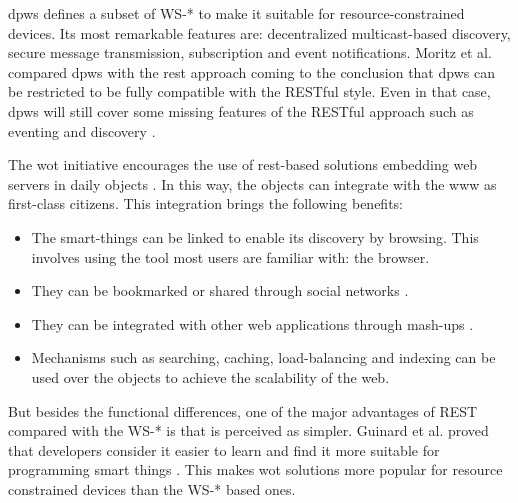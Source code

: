 

\ac{dpws} defines a subset of WS-* to make it suitable for resource-constrained devices.
Its most remarkable features are: decentralized multicast-based discovery, secure message transmission, subscription and event notifications.
Moritz et al. compared \ac{dpws} with the \ac{rest} approach coming to the conclusion that \ac{dpws} can be restricted to be fully compatible with the RESTful style.
Even in that case, \ac{dpws} will still cover some missing features of the RESTful approach such as eventing and discovery \cite{moritz_devices_2010}.


The \acl{wot} initiative encourages the use of \acs{rest}-based solutions embedding web servers in daily objects \cite{guinard_internet_2011}.
In this way, the objects can integrate with the \ac{www} as first-class citizens. %
This integration brings the following benefits:
\begin{itemize}
  \item The smart-things can be linked to enable its discovery by browsing. This involves using the tool most users are familiar with: the browser.
  \item They can be bookmarked or shared through social networks \cite{guinard_sharing_2010}.
  \item They can be integrated with other web applications through mash-ups \cite{guinard_towards_2009,ostermaier_webplug:_2010,pintus_anatomy_2011}.
  \item Mechanisms such as searching, caching, load-balancing and indexing can be used over the objects to achieve the scalability of the web. %
\end{itemize}


But besides the functional differences, one of the major advantages of REST compared with the WS-* is that is perceived as simpler.
Guinard et al. proved that developers consider it easier to learn and find it more suitable for programming smart things \cite{guinard_search_2011}.
This makes \ac{wot} solutions more popular for resource constrained devices than the WS-* based ones.

